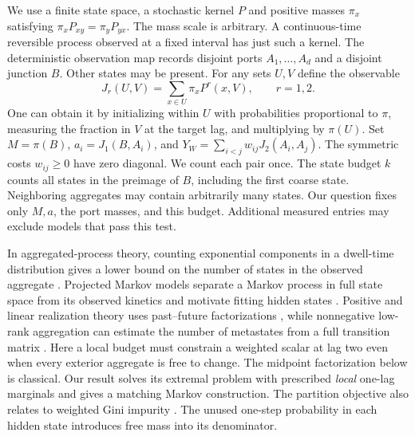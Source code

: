 \documentclass[11pt]{article}
\begin{document}
We use a finite state space, a stochastic kernel \(P\) and positive masses \(\pi_x\) satisfying \(\pi_x P_{xy}=\pi_y P_{yx}\). The mass scale is arbitrary. A continuous-time reversible process observed at a fixed interval has just such a kernel. The deterministic observation map records disjoint ports \(A_1,\ldots,A_d\) and a disjoint junction \(B\). Other states may be present. For any sets \(U,V\) define the observable
\[
 J_r(U,V)=\sum_{x\in U}\pi_x P^r(x,V),\qquad r=1,2.
\]
One can obtain it by initializing within \(U\) with probabilities proportional to \(\pi\), measuring the fraction in \(V\) at the target lag, and multiplying by \(\pi(U)\). Set \(M=\pi(B)\), \(a_i=J_1(B,A_i)\), and \(Y_W=\sum_{i<j}w_{ij}J_2(A_i,A_j)\). The symmetric costs \(w_{ij}\ge0\) have zero diagonal. We count each pair once. The state budget \(k\) counts all states in the preimage of \(B\), including the first coarse state. Neighboring aggregates may contain arbitrarily many states. Our question fixes only \(M,a\), the port masses, and this budget. Additional measured entries may exclude models that pass this test.

In aggregated-process theory, counting exponential components in a dwell-time distribution gives a lower bound on the number of states in the observed aggregate \cite{fredkin}. Projected Markov models separate a Markov process in full state space from its observed kinetics and motivate fitting hidden states \cite{noe}. Positive and linear realization theory uses past--future factorizations \cite{vidyasagar}, while nonnegative low-rank aggregation can estimate the number of metastates from a full transition matrix \cite{duan}. Here a local budget must constrain a weighted scalar at lag two even when every exterior aggregate is free to change. The midpoint factorization below is classical. Our result solves its extremal problem with prescribed \emph{local} one-lag marginals and gives a matching Markov construction. The partition objective also relates to weighted Gini impurity \cite{cicalese}. The unused one-step probability in each hidden state introduces free mass into its denominator.
\end{document}
